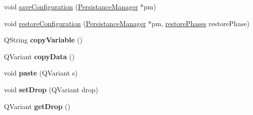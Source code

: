 \begin{DoxyCompactItemize}
\item 
void \hyperlink{classQEPvProperties_ab2114c00c762df6a841a528c34aff2f7}{saveConfiguration} (\hyperlink{classPersistanceManager}{PersistanceManager} $\ast$pm)
\item 
void \hyperlink{classQEPvProperties_a50a0562e96d18c08356acd6345372bd6}{restoreConfiguration} (\hyperlink{classPersistanceManager}{PersistanceManager} $\ast$pm, \hyperlink{classQEWidget_acff38ca69eed5b30a9d5f9d055e7a0b1}{restorePhases} restorePhase)
\item 
\hypertarget{classQEPvProperties_ad0d9ae97903b0edd99cbf5c5d723c58d}{
QString {\bfseries copyVariable} ()}
\label{classQEPvProperties_ad0d9ae97903b0edd99cbf5c5d723c58d}

\item 
\hypertarget{classQEPvProperties_ac62eb2a212441fed24e83e04f6253f32}{
QVariant {\bfseries copyData} ()}
\label{classQEPvProperties_ac62eb2a212441fed24e83e04f6253f32}

\item 
\hypertarget{classQEPvProperties_af5325198136a41284afe28efd77a23c9}{
void {\bfseries paste} (QVariant s)}
\label{classQEPvProperties_af5325198136a41284afe28efd77a23c9}

\item 
\hypertarget{classQEPvProperties_a3340ea4634eb646e00d3e0be26f06d06}{
void {\bfseries setDrop} (QVariant drop)}
\label{classQEPvProperties_a3340ea4634eb646e00d3e0be26f06d06}

\item 
\hypertarget{classQEPvProperties_a3fad54e192a43d96e271fa5b8333b537}{
QVariant {\bfseries getDrop} ()}
\label{classQEPvProperties_a3fad54e192a43d96e271fa5b8333b537}

\end{DoxyCompactItemize}
